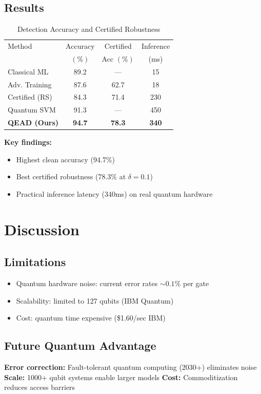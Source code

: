 \documentclass[conference]{IEEEtran}
\begin{document}
\subsection{Results}

\begin{table}[h]
\centering
\caption{Detection Accuracy and Certified Robustness}
\begin{tabular}{lccc}
\hline
Method & Accuracy & Certified & Inference \\
 & $(\%)$ & Acc $(\%)$ & (ms) \\
\hline
Classical ML & 89.2 & --- & 15 \\
Adv. Training & 87.6 & 62.7 & 18 \\
Certified (RS) & 84.3 & 71.4 & 230 \\
Quantum SVM & 91.3 & --- & 450 \\
\textbf{QEAD (Ours)} & \textbf{94.7} & \textbf{78.3} & \textbf{340} \\
\hline
\end{tabular}
\end{table}

\textbf{Key findings:}
\begin{itemize}
\item Highest clean accuracy (94.7\%)
\item Best certified robustness (78.3\% at $\delta=0.1$)
\item Practical inference latency (340ms) on real quantum hardware
\end{itemize}

\section{Discussion}

\subsection{Limitations}
\begin{itemize}
\item Quantum hardware noise: current error rates $\sim 0.1\%$ per gate
\item Scalability: limited to 127 qubits (IBM Quantum)
\item Cost: quantum time expensive (\$1.60/sec IBM)
\end{itemize}

\subsection{Future Quantum Advantage}
\textbf{Error correction:} Fault-tolerant quantum computing (2030+) eliminates noise
\textbf{Scale:} 1000+ qubit systems enable larger models
\textbf{Cost:} Commoditization reduces access barriers
\end{document}
